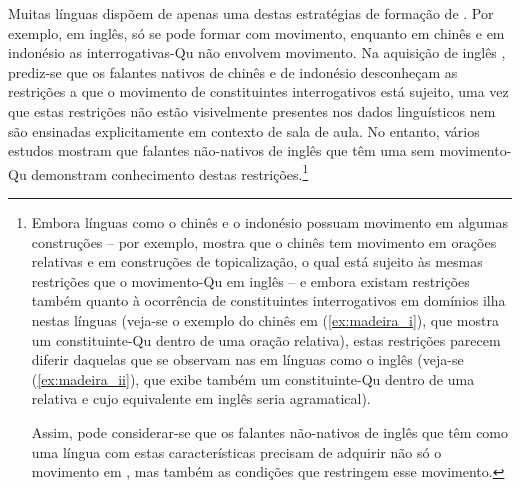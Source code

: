 \documentclass[output=paper]{LSP/langsci}
\begin{document}
Muitas línguas dispõem de apenas uma destas estratégias de formação de . Por exemplo, em inglês, só se pode formar  com movimento, enquanto em chinês e em indonésio as interrogativas-Qu não envolvem movimento. Na aquisição de inglês , prediz-se que os falantes nativos de chinês e de indonésio desconheçam as restrições a que o movimento de constituintes interrogativos está sujeito, uma vez que estas restrições não estão visivelmente presentes nos dados linguísticos nem são ensinadas explicitamente em contexto de sala de aula. No entanto, vários estudos mostram que falantes não-nativos de inglês que têm uma  sem movimento-Qu demonstram conhecimento destas restrições.\footnote{Embora línguas como o chinês e o indonésio possuam movimento em algumas construções – por exemplo, \citet{huang1982} mostra que o chinês tem movimento em orações relativas e em construções de topicalização, o qual está sujeito às mesmas restrições que o movimento-Qu em inglês – e embora existam restrições também quanto à ocorrência de constituintes interrogativos em domínios ilha nestas línguas (veja-se o exemplo do chinês em (\ref{ex:madeira_i}), que mostra um constituinte-Qu dentro de uma oração relativa), estas restrições parecem diferir daquelas que se observam nas  em línguas como o inglês (veja-se (\ref{ex:madeira_ii}), que exibe também um constituinte-Qu dentro de uma relativa e cujo equivalente em inglês seria agramatical).

\z
{}
\z
Assim, pode considerar-se que os falantes não-nativos de inglês que têm como  uma língua com estas características precisam de adquirir não só o movimento em , mas também as condições que restringem esse movimento.
}
\end{document}
